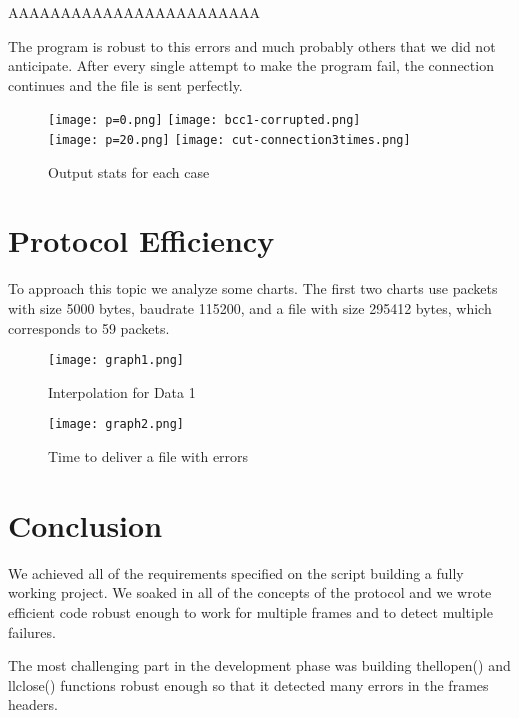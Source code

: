 \documentclass[main.tex]{subfiles}
\begin{document}
AAAAAAAAAAAAAAAAAAAAAAAA

The program is robust to this errors and much probably others that we did not anticipate.
After every single attempt to make the program fail, the connection continues and the file is sent perfectly.

\begin{figure}[htbp]
\centering
\texttt{[image: p=0.png]}
\texttt{[image: bcc1-corrupted.png]}\\
\medskip
\texttt{[image: p=20.png]}
\texttt{[image: cut-connection3times.png]}
\caption{Output stats for each case}
\label{fig:example}
\end{figure}

\section{Protocol Efficiency}
\label{sec:pefficiency}

To approach this topic we analyze some charts.
The first two charts use packets with size 5000 bytes, baudrate 115200, and a file with size 295412 bytes, which corresponds to 59 packets. 

\begin{figure}[htbp]
\begin{minipage}{0.48\textwidth}
\centering
\texttt{[image: graph1.png]}
\caption{Interpolation for Data 1}
\label{Fig:Data1}
\end{minipage}\hfill
\begin{minipage}{0.48\textwidth}
\centering
\texttt{[image: graph2.png]}
\caption{Time to deliver a file with errors}
\label{Fig:Data2}
\end{minipage}
\end{figure}

\section{Conclusion}
\label{sec:conclusion}

We achieved all of the requirements specified on the script building a fully working project. We soaked in all of the concepts of the protocol and we wrote efficient code robust enough to work for multiple frames and to detect multiple failures.

The most challenging part in the development phase was building thellopen() and llclose() functions robust enough so that it detected many errors in the frames headers.
\end{document}

